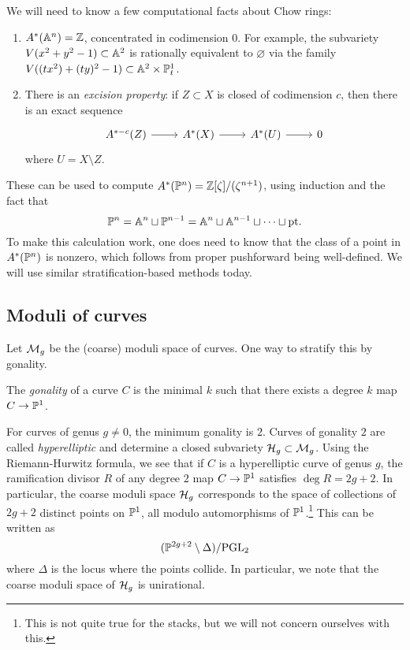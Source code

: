 \documentclass{amsart}
\begin{document}
We will need to know a few computational facts about Chow rings:
\begin{enumerate}
	\item $A^*(\AA^n) = \ZZ$, concentrated in codimension $0$.
		For example, the subvariety $V(x^2 + y^2 - 1) \subset \AA^2$ is rationally equivalent to $\varnothing$ via the family $V((tx^2) + (ty)^2- 1) \subset \AA^2 \times \PP^1_t$.
	\item There is an \emph{excision property}: if $Z \subset X$ is closed of codimension $c$, then there is an exact sequence
		\[
			\begin{tikzcd}
				A^{*-c}(Z) \rar & A^*(X) \rar & A^*(U) \rar & 0
			\end{tikzcd}
		\]
		where $U = X \setminus Z$.
\end{enumerate}

These can be used to compute $A^*(\PP^n) = \ZZ[\zeta] / (\zeta^{n+1})$, using induction and the fact that
\[
	\PP^n = \AA^n \sqcup \PP^{n-1} = \AA^n \sqcup \AA^{n-1} \sqcup \dots \sqcup \pt.
\]
To make this calculation work, one does need to know that the class of a point in $A^*(\PP^n)$ is nonzero, which follows from proper pushforward being well-defined.
We will use similar stratification-based methods today.

\subsection{Moduli of curves}

Let $\Mc_g$ be the (coarse) moduli space of curves.
One way to stratify this by gonality.

\begin{dfn}
	The \emph{gonality} of a curve $C$ is the minimal $k$ such that there exists a degree $k$ map $C \to \PP^1$.
\end{dfn}

For curves of genus $g \neq 0$, the minimum gonality is $2$.
Curves of gonality $2$ are called \emph{hyperelliptic} and determine a closed subvariety $\Hc_g \subset \Mc_g$.
Using the Riemann-Hurwitz formula, we see that if $C$ is a hyperelliptic curve of genus $g$, the ramification divisor $R$ of any degree $2$ map $C \to \PP^1$ satisfies $\deg R = 2g + 2$.
In particular, the coarse moduli space $\Hc_g$ corresponds to the space of collections of $2g + 2$ distinct points on $\PP^1$, all modulo automorphisms of $\PP^1$.\footnote{This is not quite true for the stacks, but we will not concern ourselves with this.}
This can be written as
\[
	(\PP^{2g+2} \setminus \Delta) / \PGL_2
\]
where $\Delta$ is the locus where the points collide.
In particular, we note that the coarse moduli space of $\Hc_g$ is unirational.
\end{document}

